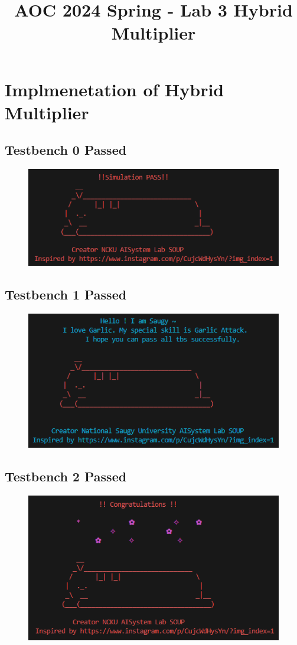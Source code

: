 \documentclass[12pt]{article}
\title{\Large AOC 2024 Spring - Lab 3 Hybrid Multiplier}
\begin{document}
\maketitle

\section{Implmenetation of Hybrid Multiplier}

\subsection*{Testbench 0 Passed}
\begin{figure}[h]
    \centering
    \includegraphics[width=0.4\linewidth]{./images/tb0.png}
\end{figure}

\subsection*{Testbench 1 Passed}
\begin{figure}[h]
    \centering
    \includegraphics[width=0.4\linewidth]{./images/tb1.png}
\end{figure}

\subsection*{Testbench 2 Passed}
\begin{figure}[h]
    \centering
    \includegraphics[width=0.4\linewidth]{./images/tb2.png}
\end{figure}
\end{document}
